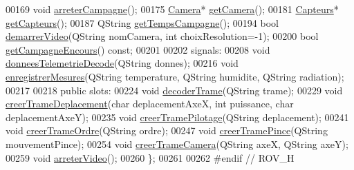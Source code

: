 \begin{DoxyCode}
00169     \textcolor{keywordtype}{void} \hyperlink{class_rov_ad53e8d86817c81f92e3113b0394bedc5}{arreterCampagne}();
00175     \hyperlink{class_camera}{Camera}* \hyperlink{class_rov_ac1eeb568d39018359b89384c2ee6ee86}{getCamera}();
00181     \hyperlink{class_capteurs}{Capteurs}* \hyperlink{class_rov_a7e231245b39e7cc8026324e337b34c64}{getCapteurs}();
00187     QString \hyperlink{class_rov_aa977585d4377a57281004fd57208635a}{getTempsCampagne}();
00194     \textcolor{keywordtype}{bool} \hyperlink{class_rov_aaf1a53557b6e8f0ae2497a0af93bd6db}{demarrerVideo}(QString nomCamera, \textcolor{keywordtype}{int} choixResolution=-1);
00200     \textcolor{keywordtype}{bool} \hyperlink{class_rov_a59d1a6d2ca83324e6efc0b74f2cff686}{getCampagneEncours}() \textcolor{keyword}{const};
00201 
00202 signals:
00208     \textcolor{keywordtype}{void} \hyperlink{class_rov_ae868f3f3d691fcd6ecb97ee770541475}{donneesTelemetrieDecode}(QString donnes);
00216     \textcolor{keywordtype}{void} \hyperlink{class_rov_a180b955cc5ee7e01196299377e0c5f33}{enregistrerMesures}(QString temperature, QString humidite, QString radiation);
00217 
00218 \textcolor{keyword}{public} slots:
00224     \textcolor{keywordtype}{void} \hyperlink{class_rov_ad818ff6ee1210ae44a24106b2bbbee7d}{decoderTrame}(QString trame);
00229     \textcolor{keywordtype}{void} \hyperlink{class_rov_aa264d0723f6b491425ac2f85b933bab2}{creerTrameDeplacement}(\textcolor{keywordtype}{char} deplacementAxeX, \textcolor{keywordtype}{int} puissance, \textcolor{keywordtype}{char} 
      deplacementAxeY);
00235     \textcolor{keywordtype}{void} \hyperlink{class_rov_a97be62676ab0d57d5a8ac498147905ec}{creerTramePilotage}(QString deplacement);
00241     \textcolor{keywordtype}{void} \hyperlink{class_rov_a9e80eccfada890561e8af1f3426f6a2b}{creerTrameOrdre}(QString ordre);
00247     \textcolor{keywordtype}{void} \hyperlink{class_rov_a66be7f6ff6e20da160d55e0cd0605965}{creerTramePince}(QString mouvementPince);
00254     \textcolor{keywordtype}{void} \hyperlink{class_rov_a204b1f4efe5a89f4458d84e17858e7c8}{creerTrameCamera}(QString axeX, QString axeY);
00259     \textcolor{keywordtype}{void} \hyperlink{class_rov_a241368439666a2549faff42931d82dfb}{arreterVideo}();
00260 \};
00261 
00262 \textcolor{preprocessor}{#endif // ROV\_H}
\end{DoxyCode}
